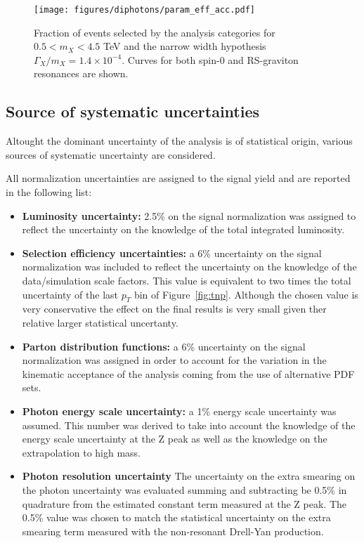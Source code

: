 \begin{figure}[!h]
  \centering
  \texttt{[image: figures/diphotons/param\_eff\_acc.pdf]}
  \caption{Fraction of events selected by the analysis categories for
    $0.5 < m_X < 4.5$ TeV and the narrow width hypothesis $\Gamma_X/m_X = 1.4\times 10^{-4}$.
    Curves for both spin-0 and RS-graviton resonances are shown.}
  \label{fig:eff_times_acc}
\end{figure}

\clearpage
\subsection{Source of systematic uncertainties}
\label{sec:syst}
Altought the dominant uncertainty of the analysis is of statistical origin, various sources of systematic
uncertainty are considered.

All normalization uncertainties are assigned to the signal yield and are
reported in the following list:

\begin{itemize}
\item {\bf Luminosity uncertainty:} 2.5\% on the signal normalization was assigned to
    reflect the uncertainty on the knowledge of the total integrated luminosity.
\item {\bf Selection efficiency uncertainties:} a 6\% uncertainty on the signal
    normalization was included to reflect the uncertainty on the knowledge of the
    data/simulation scale factors. This value is equivalent to two times the total uncertainty of the last $p_T$ bin of
    Figure~\ref{fig:tnp}. Although the chosen value is very conservative the effect on the final results is very
    small given ther relative larger statistical uncertanty.
\item {\bf Parton distribution functions: } a 6\% uncertainty on the signal normalization
    was assigned in order to account for the variation in the kinematic acceptance of the
    analysis coming from the use of alternative PDF sets.
\item {\bf Photon energy scale uncertainty:} a 1\% energy scale uncertainty was assumed. 
    This number was derived to take into account the knowledge of the energy scale uncertainty at the Z peak as well 
    as the knowledge on the extrapolation to high mass.
\item {\bf Photon resolution uncertainty} The uncertainty on the extra smearing on the
    photon uncertainty was evaluated summing and subtracting be 0.5\% in quadrature from
    the estimated constant term measured at the Z peak. The 0.5\% value was chosen to
    match the statistical uncertainty on the extra smearing term measured with the
    non-resonant Drell-Yan production.
\end{itemize}

